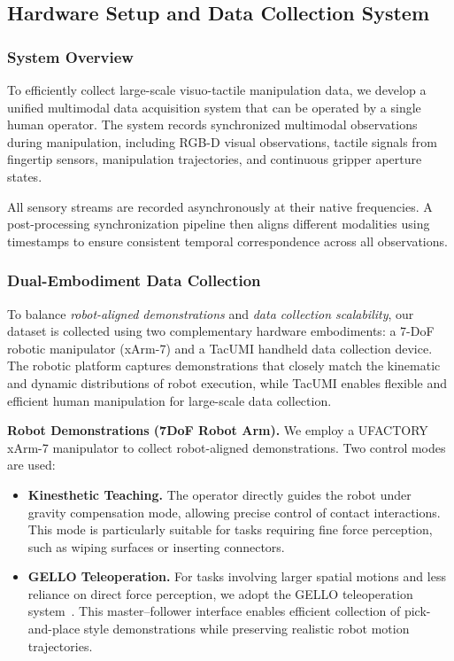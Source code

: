 \subsection{Hardware Setup and Data Collection System}
\label{sec:hardware}

\subsubsection{System Overview}

To efficiently collect large-scale visuo-tactile manipulation data, we develop a unified multimodal data acquisition system that can be operated by a single human operator. The system records synchronized multimodal observations during manipulation, including RGB-D visual observations, tactile signals from fingertip sensors, manipulation trajectories, and continuous gripper aperture states.

All sensory streams are recorded asynchronously at their native frequencies. A post-processing synchronization pipeline then aligns different modalities using timestamps to ensure consistent temporal correspondence across all observations.

\subsubsection{Dual-Embodiment Data Collection}

To balance \emph{robot-aligned demonstrations} and \emph{data collection scalability}, our dataset is collected using two complementary hardware embodiments: a 7-DoF robotic manipulator (xArm-7) and a TacUMI handheld data collection device. The robotic platform captures demonstrations that closely match the kinematic and dynamic distributions of robot execution, while TacUMI enables flexible and efficient human manipulation for large-scale data collection.

\noindent \textbf{Robot Demonstrations (7DoF Robot Arm).}
We employ a {UFACTORY xArm-7} manipulator to collect robot-aligned demonstrations. Two control modes are used:

\begin{itemize}
\item \textbf{Kinesthetic Teaching.} The operator directly guides the robot under gravity compensation mode, allowing precise control of contact interactions. This mode is particularly suitable for tasks requiring fine force perception, such as wiping surfaces or inserting connectors.

\item \textbf{GELLO Teleoperation.} For tasks involving larger spatial motions and less reliance on direct force perception, we adopt the {GELLO teleoperation system}~\cite{wu2024gello}. This master–follower interface enables efficient collection of pick-and-place style demonstrations while preserving realistic robot motion trajectories.
\end{itemize}

